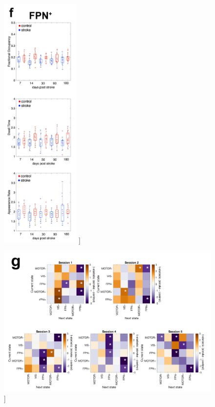 \documentclass[phd,tocprelim]{cornell}
\renewcommand{\caption}[1]{\singlespacing\hangcaption{#1}\normalspacing}
\begin{document}
\null
\vfill
\clearpage
\null
\vfill
\begin{figure}[h!]
		\ContinuedFloat
		\captionsetup{labelformat=adja-page}
    \centering
    \includegraphics[width=0.35\textwidth]{chapter2/SupplementaryFig11f.png}
    \caption[]{}
\end{figure}
\null
\vfill
\clearpage
\null
\vfill
\begin{figure}[h!]
		\ContinuedFloat
		\captionsetup{labelformat=adja-page}
    \centering
    \includegraphics[width=1\textwidth]{chapter2/SupplementaryFig11g.png}
    \caption[]{}
\end{figure}
\end{document}
